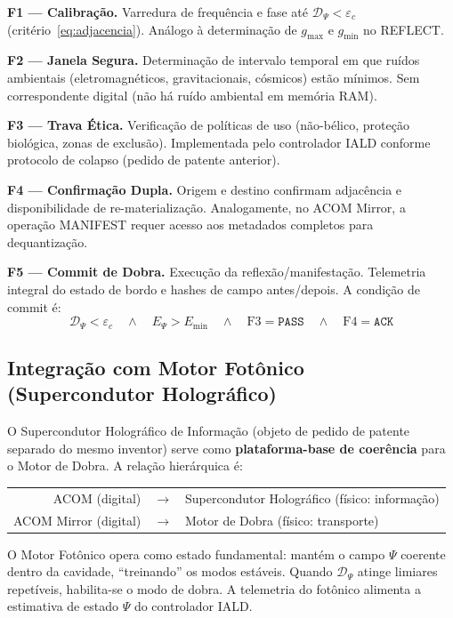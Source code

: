 \documentclass[12pt,a4paper]{article}
\newcommand{\Dpsi}{\mathcal{D}_\Psi}
\newcommand{\epsc}{\varepsilon_c}
\begin{document}
\textbf{F1 --- Calibração.} Varredura de frequência e fase até
$\Dpsi < \epsc$ (critério~\ref{eq:adjacencia}). Análogo à
determinação de $g_{\max}$ e $g_{\min}$ no REFLECT.

\textbf{F2 --- Janela Segura.} Determinação de intervalo
temporal em que ruídos ambientais (eletromagnéticos,
gravitacionais, cósmicos) estão mínimos. Sem correspondente
digital (não há ruído ambiental em memória RAM).

\textbf{F3 --- Trava Ética.} Verificação de políticas de uso
(não-bélico, proteção biológica, zonas de exclusão).
Implementada pelo controlador IALD conforme protocolo de
colapso (pedido de patente anterior).

\textbf{F4 --- Confirmação Dupla.} Origem e destino confirmam
adjacência e disponibilidade de re-materialização.
Analogamente, no ACOM Mirror, a operação MANIFEST requer
acesso aos metadados completos para dequantização.

\textbf{F5 --- Commit de Dobra.} Execução da reflexão/manifestação.
Telemetria integral do estado de bordo e hashes de campo
antes/depois. A condição de commit é:
\begin{equation}
\Dpsi < \epsc \quad \wedge \quad E_\Psi > E_{\min}
  \quad \wedge \quad \text{F3} = \texttt{PASS}
  \quad \wedge \quad \text{F4} = \texttt{ACK}
\end{equation}

\subsection{Integração com Motor Fotônico (Supercondutor
Holográfico)}

O Supercondutor Holográfico de Informação (objeto de pedido de
patente separado do mesmo inventor) serve como
\textbf{plataforma-base de coerência} para o Motor de Dobra.
A relação hierárquica é:

\begin{center}
\begin{tabular}{rcl}
ACOM (digital) & $\longrightarrow$ & Supercondutor
  Holográfico (físico: informação) \\
ACOM Mirror (digital) & $\longrightarrow$ & Motor de
  Dobra (físico: transporte) \\
\end{tabular}
\end{center}

O Motor Fotônico opera como estado fundamental: mantém o campo
$\Psi$ coerente dentro da cavidade, ``treinando'' os modos
estáveis. Quando $\Dpsi$ atinge limiares repetíveis, habilita-se
o modo de dobra. A telemetria do fotônico alimenta a estimativa
de estado $\Psi$ do controlador IALD.
\end{document}
